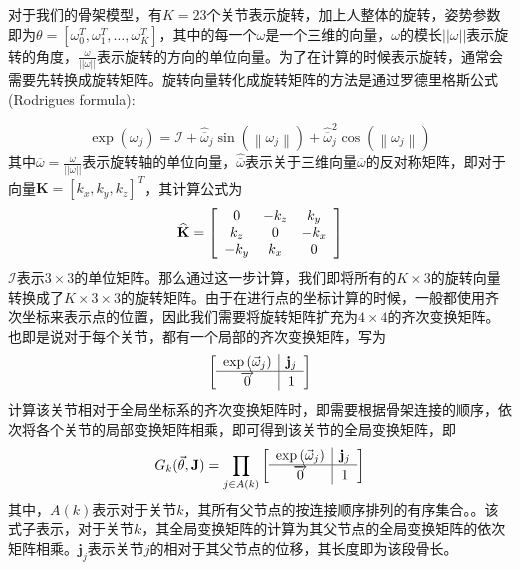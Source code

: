 对于我们的骨架模型，有\(K=23\)个关节表示旋转，加上人整体的旋转，姿势参数即为\(\theta = [\omega_0^T, \omega_1^T, \ldots, \omega_K^T]\)，其中的每一个\(\omega\)是一个三维的向量，\(\omega\)的模长\(||\omega||\)表示旋转的角度，\(\frac{\omega}{||\omega||}\)表示旋转的方向的单位向量。为了在计算的时候表示旋转，通常会需要先转换成旋转矩阵。旋转向量转化成旋转矩阵的方法是通过罗德里格斯公式(Rodrigues formula):

\begin{equation}
    \exp \left(  \omega  _ { j } \right) = \mathcal { I } + \widehat { \overline { \omega }} _ { j } \sin \left( \left\|  \omega  _ { j } \right\| \right) + \widehat { \overline { \omega } } _ { j } ^ { 2 } \cos \left( \left\| \omega_ { j } \right\| \right)
\end{equation}
其中\(\overline { \omega } = \frac{\omega}{||\omega||}\)表示旋转轴的单位向量，\(\widehat { \overline { \omega }}\)表示关于三维向量\(\overline{\omega}\)的反对称矩阵，即对于向量\(\mathbf{K} = [k_x, k_y, k_z]^T\)，其计算公式为
\begin{equation}
\widehat{\mathbf { K }} = \left[ \begin{array} { c c c } { 0 } & { - k _ { z } } & { k _ { y } } \\ { k _ { z } } & { 0 } & { - k _ { x } } \\ { - k _ { y } } & { k _ { x } } & { 0 } \end{array} \right]
\end{equation}
\(\mathcal { I }\)表示\(3\times 3\)的单位矩阵。那么通过这一步计算，我们即将所有的\(K \times 3\)的旋转向量转换成了\(K\times 3 \times 3\)的旋转矩阵。由于在进行点的坐标计算的时候，一般都使用齐次坐标来表示点的位置，因此我们需要将旋转矩阵扩充为\(4\times 4\)的齐次变换矩阵。也即是说对于每个关节，都有一个局部的齐次变换矩阵，写为
\begin{equation}
\left[ \begin{array} { c | c } { \exp \left( \vec { \omega } _ { j } \right) } & { \mathbf { j } _ { j } } \\ \hline \overrightarrow { 0 } & { 1 } \end{array} \right]
\end{equation}
计算该关节相对于全局坐标系的齐次变换矩阵时，即需要根据骨架连接的顺序，依次将各个关节的局部变换矩阵相乘，即可得到该关节的全局变换矩阵，即
\begin{equation}
    G _ { k } ( \vec { \theta } , \mathbf { J } ) = \prod _ { j \in A ( k ) } \left[ \begin{array} { c | c } { \exp \left( \vec { \omega } _ { j } \right) } & { \mathbf { j } _ { j } } \\ \hline \overrightarrow { 0 } & { 1 } \end{array} \right]
\end{equation}
其中，\(A(k)\)表示对于关节\(k\)，其所有父节点的按连接顺序排列的有序集合。。该式子表示，对于关节\(k\)，其全局变换矩阵的计算为其父节点的全局变换矩阵的依次矩阵相乘。\(\mathbf{j}_j\)表示关节\(j\)的相对于其父节点的位移，其长度即为该段骨长。
 
